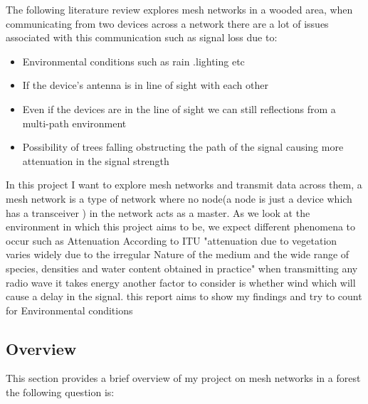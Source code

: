 The following literature review explores mesh networks in a wooded area,
	when communicating from two devices across a network there are a lot of issues associated with this communication
	such as signal loss due to:
	\begin{itemize}
		\item Environmental conditions such as rain .lighting etc
		\item If the device's antenna is in line of sight with each other
		\item Even if the devices are in the line of sight we can still reflections from a multi-path environment
		\item Possibility of trees falling obstructing the path of the signal causing more attenuation in the signal strength
	\end{itemize}
	In this project I want to explore mesh networks and transmit data across them,  a mesh network is a type of network where no node(a node is just a device which has a transceiver ) in the network acts as a  master.
	As we look at the environment in which this project aims to be, we expect different phenomena to occur such as  Attenuation According to ITU \cite{ITU} "attenuation due to vegetation varies widely due to the irregular Nature of the medium and the wide range of species, densities and water content obtained in practice"
	when transmitting any radio wave it takes energy another factor to consider is whether wind which will cause a  delay in the signal. this report aims to show my findings and try to count for Environmental conditions
	\subsection{Overview} \label{sec: overview}

		This section provides a brief overview of  my project on mesh networks in a forest the following question is:
		
